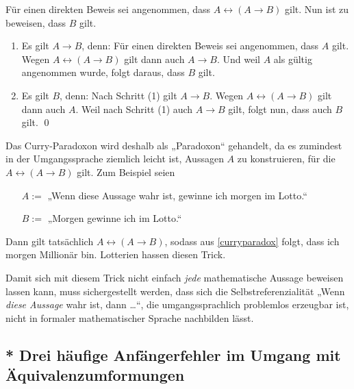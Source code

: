 \begin{bew}
    Für einen direkten Beweis sei angenommen, dass $A\leftrightarrow (A\to B)$ gilt. Nun ist zu beweisen, dass $B$ gilt.
    \begin{enumerate}[(1)]
        \item Es gilt $A\to B$, denn: Für einen direkten Beweis sei angenommen, dass $A$ gilt. Wegen $A\leftrightarrow (A\to B)$ gilt dann auch $A\to B$. Und weil $A$ als gültig angenommen wurde, folgt daraus, dass $B$ gilt.
        \item Es gilt $B$, denn: Nach Schritt (1) gilt $A\to B$. Wegen $A\leftrightarrow (A\to B)$ gilt dann auch $A$. Weil nach Schritt (1) auch $A\to B$ gilt, folgt nun, dass auch $B$ gilt. \qed
    \end{enumerate}
\end{bew}


\begin{bem}
    Das Curry-Paradoxon wird deshalb als „Paradoxon“ gehandelt, da es zumindest in der Umgangssprache ziemlich leicht ist, Aussagen $A$ zu konstruieren, für die $A\leftrightarrow (A\to B)$ gilt. Zum Beispiel seien
    \begin{itemize}[labelindent=1.5em, leftmargin=!, labelwidth=]
        \item[$A:=$] „Wenn diese Aussage wahr ist, gewinne ich morgen im Lotto.“
        \item[$B:=$] „Morgen gewinne ich im Lotto.“
    \end{itemize}
    Dann gilt tatsächlich $A\leftrightarrow (A\to B)$, sodass aus \cref{curryparadox} folgt, dass ich morgen Millionär bin. Lotterien hassen diesen Trick.
    
    Damit sich mit diesem Trick nicht einfach \emph{jede} mathematische Aussage beweisen lassen kann, muss sichergestellt werden, dass sich die Selbstreferenzialität „Wenn \emph{diese Aussage} wahr ist, dann \dots“, die umgangssprachlich problemlos erzeugbar ist, nicht in formaler mathematischer Sprache nachbilden lässt.
\end{bem}





\subsection*{* Drei häufige Anfängerfehler im Umgang mit Äquivalenzumformungen}


